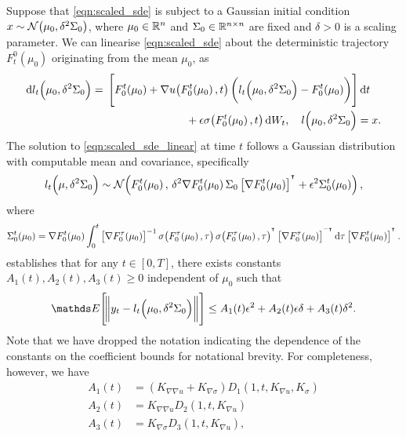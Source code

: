 Suppose that \eqref{eqn:scaled_sde} is subject to a Gaussian initial condition \(x \sim\mathcal{N}\!\left(\mu_0, \delta^2\Sigma_0\right)\), where \(\mu_0 \in \mathbb{R}^n\) and \(\Sigma_0 \in \mathbb{R}^{n\times n}\) are fixed and \(\delta > 0\) is a scaling parameter.
We can linearise \eqref{eqn:scaled_sde} about the deterministic trajectory \(F_t^0\!\left(\mu_0\right)\) originating from the mean \(\mu_0\), as
\begin{equation}
	\dif l_t\!\left(\mu_0, \delta^2\Sigma_0\right) = \begin{multlined}[t]
		\left[F_0^t\!\left(\mu_0\right) + \nabla u\!\left(F_0^t\!\left(\mu_0\right), t\right)\left(l_t\!\left(\mu_0, \delta^2 \Sigma_0\right) - F_0^t\!\left(\mu_0\right)\right)\right]\dif t \\
		+ \epsilon\sigma\!\left(F_0^t\!\left(\mu_0\right), t\right)\dif W_t, \quad l\!\left(\mu_0, \delta^2\Sigma_0\right) = x.
	\end{multlined}
	\label{eqn:scaled_sde_linear}
\end{equation}
The solution to \eqref{eqn:scaled_sde_linear} at time \(t\) follows a Gaussian distribution with computable mean and covariance, specifically
\[
	l_t\!\left(\mu, \delta^2\Sigma_0\right) \sim\mathcal{N}\!\left(F_0^t\!\left(\mu_0\right), \, \delta^2 \nabla F_0^t\!\left(\mu_0\right) \Sigma_0 \left[\nabla F_0^t\!\left(\mu_0\right)\right]^{^{\intercal}} + \epsilon^2\Sigma_0^t\!\left(\mu_0\right)\right),
\]
where
\[
	\Sigma_0^t\!\left(\mu_0\right) = \nabla F_0^t\!\left(\mu_0\right)\int_0^t{\left[\nabla F_0^\tau\!\left(\mu_0\right)\right]^{-1} \sigma\!\left(F_0^\tau\!\left(\mu_0\right), \tau\right)\sigma\!\left(F_0^\tau\!\left(\mu_0\right), \tau\right)^{\T}\left[\nabla F_0^\tau\!\left(\mu_0\right)\right]^{^{-\intercal}}\dif\tau}\left[\nabla F_0^t\!\left(\mu_0\right)\right]^{\T}.
\]
 establishes that for any \(t \in [0,T]\), there exists constants \(A_1(t), A_2(t), A_3(t) \geq 0\) independent of \(\mu_0\) such that
\begin{equation}\label{eqn:linear_error_bound}
	\avg{\norm{y_t - l_t\!\left(\mu_0, \delta^2 \Sigma_0\right)}} \leq A_1(t)\epsilon^2 + A_2(t)\epsilon\delta + A_3(t)\delta^2.
\end{equation}
Note that we have dropped the notation indicating the dependence of the constants on the coefficient bounds for notational brevity.
For completeness, however, we have
\begin{align*}
	A_1(t) & = \left(K_{\nabla\nabla u} + K_{\nabla\sigma}\right)D_1\!\left(1, t, K_{\nabla u}, K_\sigma\right) \\
	A_2(t) & = K_{\nabla\nabla u} D_2\!\left(1, t, K_{\nabla u}\right)                                          \\
	A_3(t) & = K_{\nabla\sigma}D_3\!\left(1, t, K_{\nabla u}\right),
\end{align*}
